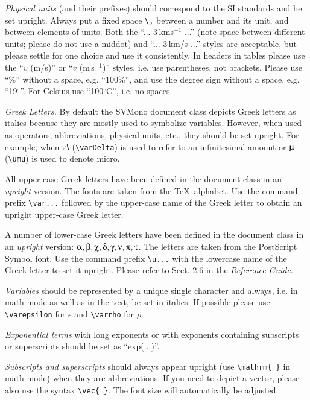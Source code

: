 \documentclass[graybox]{svmono}
\begin{document}
{\it Physical units} (and their prefixes) should correspond to the SI standards and be set upright. Always put a fixed space \verb|\,| between a number and its unit, and between elements of units. Both the ``... 3\,kms$^{-1}$ ...'' (note space between different units; please do not use a middot) and ``... 3\,km/s ...'' styles are acceptable, but please settle for one choice and use it consistently. In headers in tables please use the ``$v$ (m/s)'' or ``$v$ (m\,s$^{-1}$)'' styles, i.e. use parentheses, not brackets. Please use ``\%'' without a space, e.g. ``100\%'', and use the degree sign without a space, e.g. ``19$^{\circ}$''. For Celsius use ``100$^{\circ}$C'', i.e. no spaces.

{\it Greek Letters.} By default the {\sc SVMono} document class depicts Greek letters as italics because they are mostly used to symbolize variables. However, when used as operators, abbreviations, physical units, etc., they should be set upright. For example, when $\varDelta$ (\verb|\varDelta|) is used to refer to an infinitesimal amount or $\umu$ (\verb|\umu|) is used to denote micro.

All upper-case Greek letters have been defined in the document class in an {\it upright} version. The fonts are taken from the \TeX~alphabet. Use the command prefix \verb|\var...| followed by the upper-case name of the Greek letter to obtain an upright upper-case Greek letter.

A number of lower-case Greek letters have been defined in the document class in an {\it upright} version: $\ualpha, \ubeta, \uchi, \udelta, \ugamma, \unu, \upi, \utau$. The letters are taken from the PostScript Symbol font. Use the command prefix \verb|\u...| with the lower­case name of the Greek letter to set it upright. Please refer to Sect. 2.6 in the {\it Reference Guide}.

{\it Variables} should be represented by a unique single character and always, i.e. in math mode as well as in the text, be set in italics. If possible please use \verb|\varepsilon| for $\epsilon$ and \verb|\varrho| for $\rho$.

{\it Exponential terms} with long exponents or with exponents containing subscripts or superscripts should be set as ``exp(...)''.

{\it Subscripts and superscripts} should always appear upright (use \verb|\mathrm{ }| in math mode) when they are abbreviations. If you need to depict a vector, please also use the syntax \verb|\vec{ }|. The font size will automatically be adjusted.
\end{document}
